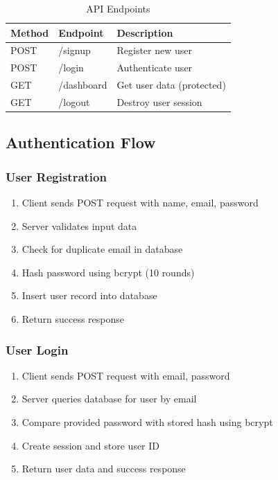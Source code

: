 \documentclass[12pt,a4paper]{article}
\begin{document}
\begin{table}[h]
\centering
\begin{tabular}{|l|l|l|}
\hline
\textbf{Method} & \textbf{Endpoint} & \textbf{Description} \\
\hline
POST & /signup & Register new user \\
POST & /login & Authenticate user \\
GET & /dashboard & Get user data (protected) \\
GET & /logout & Destroy user session \\
\hline
\end{tabular}
\caption{API Endpoints}
\end{table}

\subsection{Authentication Flow}

\subsubsection{User Registration}
\begin{enumerate}
    \item Client sends POST request with name, email, password
    \item Server validates input data
    \item Check for duplicate email in database
    \item Hash password using bcrypt (10 rounds)
    \item Insert user record into database
    \item Return success response
\end{enumerate}

\subsubsection{User Login}
\begin{enumerate}
    \item Client sends POST request with email, password
    \item Server queries database for user by email
    \item Compare provided password with stored hash using bcrypt
    \item Create session and store user ID
    \item Return user data and success response
\end{enumerate}
\end{document}
